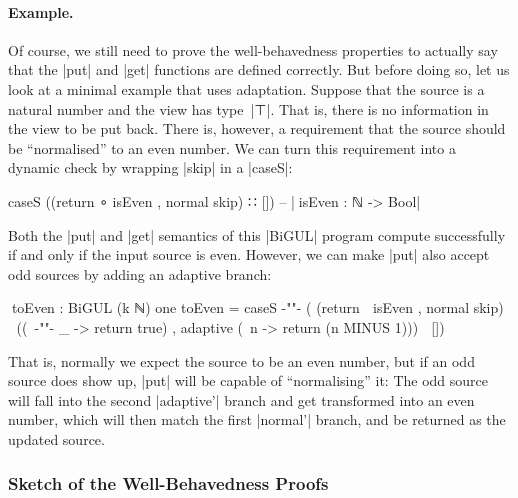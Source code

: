 \documentclass{sigplanconf}
\begin{document}
\paragraph{Example.}
Of course, we still need to prove the well-behavedness properties to actually say that the |put| and |get| functions are defined correctly.
But before doing so, let us look at a minimal example that uses adaptation.
Suppose that the source is a natural number and the view has type~|⊤|.
That is, there is no information in the view to be put back.
There is, however, a requirement that the source should be ``normalised'' to an even number.
We can turn this requirement into a dynamic check by wrapping |skip| in a |caseS|:
\begin{code}
caseS ((return ∘ isEven , normal skip) ∷ [])
  -- |^^^isEven : ℕ -> Bool|
\end{code}
Both the |put| and |get| semantics of this |BiGUL| program compute successfully if and only if the input source is even.
However, we can make |put| also accept odd sources by adding an adaptive branch:
\begin{code}
^^^toEven : BiGUL (k ℕ) one
toEven = caseS
  {-"\!\!"-} (  (return ∘ isEven                , normal    skip) ∷
                ((\ {-"\!"-} _ -> return true)  , adaptive  (\ n -> return (n MINUS 1))) ∷ [])
\end{code}
That is, normally we expect the source to be an even number, but if an odd source does show up, |put| will be capable of ``normalising'' it: The odd source will fall into the second |adaptive'| branch and get transformed into an even number, which will then match the first |normal'| branch, and be returned as the updated source.

\subsubsection{Sketch of the Well-Behavedness Proofs}
\end{document}
